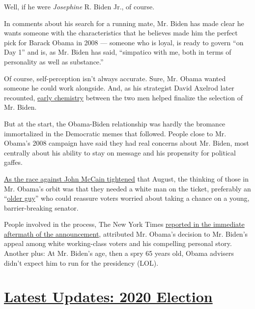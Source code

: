 Well, if he were \emph{Josephine} R. Biden Jr., of course.

In comments about his search for a running mate, Mr. Biden has made
clear he wants someone with the characteristics that he believes made
him the perfect pick for Barack Obama in 2008 --- someone who is loyal,
is ready to govern ``on Day 1'' and is, as Mr. Biden has said,
``simpatico with me, both in terms of personality as well as
substance.''

Of course, self-perception isn't always accurate. Sure, Mr. Obama wanted
someone he could work alongside. And, as his strategist David Axelrod
later recounted,
\href{https://www.usatoday.com/story/news/politics/onpolitics/2015/02/10/biden-vice-president-bayh-axelrod/81211852/}{early
chemistry} between the two men helped finalize the selection of Mr.
Biden.

But at the start, the Obama-Biden relationship was hardly the bromance
immortalized in the Democratic memes that followed. People close to Mr.
Obama's 2008 campaign have said they had real concerns about Mr. Biden,
most centrally about his ability to stay on message and his propensity
for political gaffes.

\href{https://blogs.wsj.com/washwire/2008/08/13/mccain-obama-race-enters-dead-heat/}{As
the race against John McCain tightened} that August, the thinking of
those in Mr. Obama's orbit was that they needed a white man on the
ticket, preferably an
``\href{https://www.nytimes.com/2019/08/16/us/politics/biden-obama-history.html}{older
guy}'' who could reassure voters worried about taking a chance on a
young, barrier-breaking senator.

People involved in the process, The New York Times
\href{https://www.nytimes.com/2008/08/24/us/politics/24deconstruct.html?_r=1\&hp=\&adxnnl=1\&oref=slogin\&adxnnlx=1219585399-mopoNQ9Taivokt1V0PHsig}{reported
in the immediate aftermath of the announcement}, attributed Mr. Obama's
decision to Mr. Biden's appeal among white working-class voters and his
compelling personal story. Another plus: At Mr. Biden's age, then a spry
65 years old, Obama advisers didn't expect him to run for the presidency
(LOL).

\hypertarget{latest-updates-2020-election}{%
\section{\texorpdfstring{\href{https://www.nytimes.com/2020/08/03/us/elections/biden-vs-trump.html?action=click\&pgtype=Article\&state=default\&region=MAIN_CONTENT_1\&context=storylines_live_updates}{Latest
Updates: 2020
Election}}{Latest Updates: 2020 Election}}\label{latest-updates-2020-election}}

